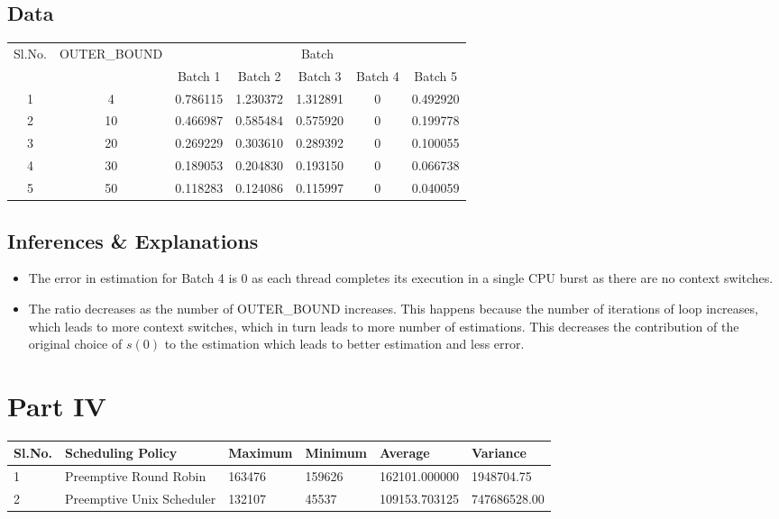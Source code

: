 \documentclass{article}
\begin{document}
\subsection{Data}
\begin{center}
    \begin{tabular}{| c | c | c | c | c | c | c |}
    \hline
    \multirow{2}{*}{Sl.No.} & \multirow{2}{*}{OUTER\_BOUND} & \multicolumn{5}{|c|}{Batch}\\ \cline{3-7}
    
     &  & Batch 1 & Batch 2 & Batch 3 & Batch 4 & Batch 5\\ \hline
     1 & 4 & 0.786115 & 1.230372 & 1.312891 & 0 & 0.492920 \\
     2 & 10 & 0.466987 & 0.585484 & 0.575920 & 0 & 0.199778\\
     3 & 20 & 0.269229 & 0.303610 & 0.289392 & 0 & 0.100055\\
     4 & 30 & 0.189053 & 0.204830 & 0.193150 & 0 & 0.066738\\
     5 & 50 & 0.118283 & 0.124086 & 0.115997 & 0 & 0.040059\\
    \hline
    \end{tabular}
\end{center}
\subsection{Inferences \& Explanations}
\begin{itemize}
  \item The error in estimation for Batch 4 is $0$ as each thread completes its execution in a single CPU burst as there are no context switches.
  \item The ratio decreases as the number of OUTER\_BOUND increases. This happens because the number of iterations of loop increases, which leads to more context switches, which in turn leads to more number of estimations. This decreases the contribution of the original choice of $s(0)$ to the estimation which leads to better estimation and less error.
\end{itemize}
\section{Part IV}
\begin{center}
    \begin{tabular}{| l | l | l | l | l | l |}
    \hline
    Sl.No. & Scheduling Policy & Maximum & Minimum & Average & Variance \\ \hline
    1 & Preemptive Round Robin & 163476 & 159626 & 162101.000000 & 1948704.75\\
    2 & Preemptive Unix Scheduler & 132107 & 45537 & 109153.703125 & 747686528.00\\
    \hline
    \end{tabular}
\end{center}
\end{document}
